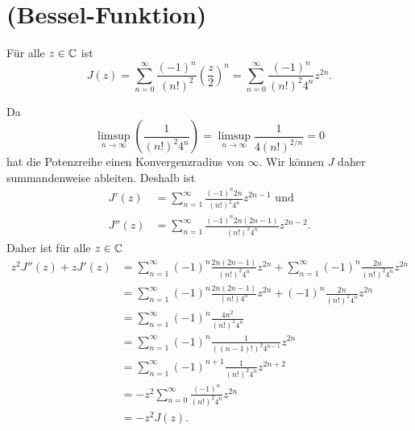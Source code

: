 \documentclass[a4paper,10pt]{article}
\begin{document}
\section{(Bessel-Funktion)}
Für alle $z \in \mathbb{C}$ ist
\[
 J(z)
 = \sum_{n=0}^\infty \frac{(-1)^n}{(n!)^2} \left( \frac{z}{2} \right)^n
 = \sum_{n=0}^\infty \frac{(-1)^n}{(n!)^2 4^n} z^{2n}.
\]

Da
\[
 \limsup_{n \to \infty} \left( \frac{1}{(n!)^2 4^n} \right) = \limsup_{n \to \infty} \frac{1}{4 (n!)^{2/n}} = 0
\]
hat die Potenzreihe einen Konvergenzradius von $\infty$. Wir können $J$ daher summandenweise ableiten. Deshalb ist
\begin{align*}
  J'(z) &= \sum_{n=1}^\infty \frac{(-1)^n 2n}{(n!)^2 4^n}{z^{2n-1}} \text{ und} \\
 J''(z) &= \sum_{n=1}^\infty \frac{(-1)^n 2n (2n-1)}{(n!)^2 4^n} z^{2n-2}.
\end{align*}
Daher ist für alle $z \in \mathbb{C}$
\begin{align*}
 z^2 J''(z) + z J'(z)
 &= \sum_{n=1}^\infty (-1)^n \frac{2n(2n-1)}{(n!)^2 4^n} z^{2n} + \sum_{n=1}^\infty (-1)^n \frac{2n}{(n!)^2 4^n} z^{2n} \\
 &= \sum_{n=1}^\infty (-1)^n \frac{2n(2n-1)}{(n!)4^n} z^{2n} + (-1)^n \frac{2n}{(n!)^2 4^n} z^{2n} \\
 &= \sum_{n=1}^\infty (-1)^n \frac{4n^2}{(n!)^2 4^n} \\
 &= \sum_{n=1}^\infty (-1)^n \frac{1}{((n-1)!)^2 4^{n-1}} z^{2n} \\
 &= \sum_{n=1}^\infty (-1)^{n+1} \frac{1}{(n!)^2 4^n} z^{2n+2} \\
 &= -z^2 \sum_{n=0}^\infty \frac{(-1)^n}{(n!)^2 4^n} z^{2n} \\
 &= -z^2 J(z).
\end{align*}
\end{document}
